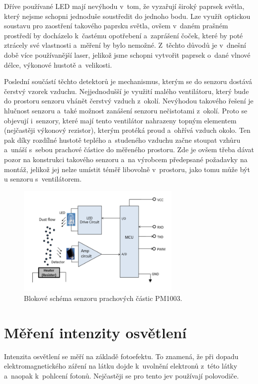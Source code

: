 Dříve používané LED mají nevýhodu v~tom, že vyzařují široký paprsek světla, který nejsme schopni jednoduše soustředit do jednoho bodu. Lze využít optickou soustavu pro zaostření takového paprsku světla, ovšem v~daném prašném prostředí by docházelo k~častému opotřebení a~zaprášení čoček, které by poté ztrácely své vlastnosti a~měření by bylo nemožné. Z~těchto důvodů je v~dnešní době více používanější laser, jelikož jsme schopni vytvořit paprsek o~dané vlnové délce, výkonové hustotě a~velikosti. 

Poslední součástí těchto detektorů je mechanismus, kterým se do senzoru dostává čerstvý vzorek vzduchu. Nejjednodušší je využití malého ventilátoru, který bude do prostoru senzoru vhánět čerstvý vzduch z~okolí. Nevýhodou takového řešení je hlučnost senzoru a~také možnost zanášení senzoru nečistotami z~okolí. Proto se objevují i~senzory, které mají tento ventilátor nahrazeny topným elementem (nejčastěji výkonový rezistor), kterým protéká proud a~ohřívá vzduch okolo. Ten pak díky rozdílné hustotě teplého a~studeného vzduchu začne stoupat vzhůru a~unáší s~sebou prachové částice do měřeného prostoru. Zde je ovšem třeba dávat pozor na konstrukci takového senzoru a~na výrobcem předepsané požadavky na montáž, jelikož jej nelze umístit téměř libovolně v~prostoru, jako tomu může být u senzoru s~ventilátorem.

\begin{figure}
    \includegraphics[width=0.70\textwidth]{obrazky/dustSensorPrinciple.png}
    \caption{Blokové schéma senzoru prachových částic PM1003. \cite{PM1003Datasheet}}
    \label{fig_dustSensorPrinciple}
\end{figure}

\section{Měření intenzity osvětlení}

Intenzita osvětlení se měří na základě fotoefektu. To znamená, že při dopadu elektromagnetického záření na látku dojde k~uvolnění elektronů z~této látky a~naopak k~pohlcení fotonů. Nejčastěji se pro tento jev používají polovodiče.

